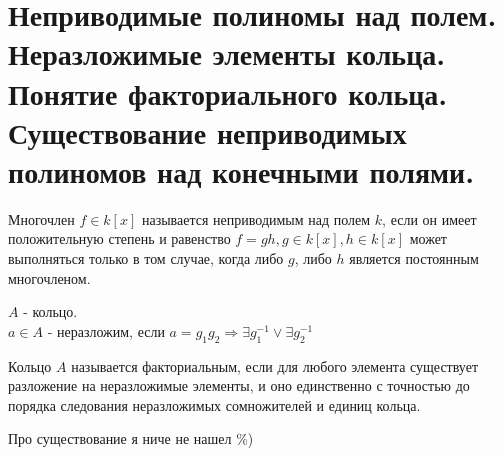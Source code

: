 \section{Неприводимые полиномы над полем. Неразложимые элементы кольца. Понятие факториального кольца. Существование
неприводимых полиномов над конечными полями.}

\begin{defn}
Многочлен $f \in k[x]$ называется неприводимым над полем $k$, если он имеет положительную степень и равенство
$f = gh, g \in k[x], h \in k[x]$ может выполняться только в том случае, когда либо $g$, либо $h$ является постоянным
многочленом.
\end{defn}

\begin{defn}
$A$ - кольцо. \\
$a \in A$ - неразложим, если $a = g_1g_2 \Rightarrow \exists g_1^{-1} \vee \exists g_2^{-1}$
\end{defn}

\begin{defn}
Кольцо $A$ называется факториальным, если для любого элемента существует разложение на неразложимые элементы, и оно
единственно с точностью до порядка следования неразложимых сомножителей и единиц кольца.
\end{defn}

Про существование я ниче не нашел \%)